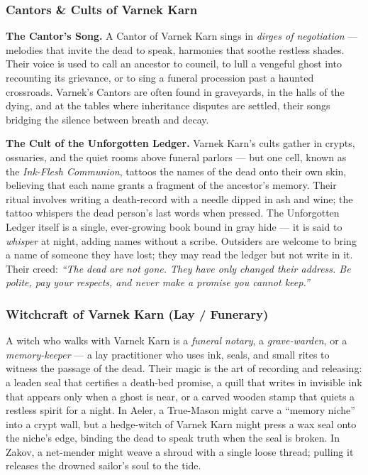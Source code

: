\subsubsection*{Cantors \& Cults of Varnek Karn}

\textbf{The Cantor's Song.} A Cantor of Varnek Karn sings in \textit{dirges of negotiation} --- melodies that invite the dead to speak, harmonies that soothe restless shades. Their voice is used to call an ancestor to council, to lull a vengeful ghost into recounting its grievance, or to sing a funeral procession past a haunted crossroads. Varnek's Cantors are often found in graveyards, in the halls of the dying, and at the tables where inheritance disputes are settled, their songs bridging the silence between breath and decay.

\textbf{The Cult of the Unforgotten Ledger.} Varnek Karn's cults gather in crypts, ossuaries, and the quiet rooms above funeral parlors --- but one cell, known as the \textit{Ink-Flesh Communion}, tattoos the names of the dead onto their own skin, believing that each name grants a fragment of the ancestor's memory. Their ritual involves writing a death-record with a needle dipped in ash and wine; the tattoo whispers the dead person's last words when pressed. The Unforgotten Ledger itself is a single, ever-growing book bound in gray hide --- it is said to \textit{whisper} at night, adding names without a scribe. Outsiders are welcome to bring a name of someone they have lost; they may read the ledger but not write in it. Their creed: \textit{``The dead are not gone. They have only changed their address. Be polite, pay your respects, and never make a promise you cannot keep.''}

\subsubsection*{Witchcraft of Varnek Karn (Lay / Funerary)}

A witch who walks with Varnek Karn is a \textit{funeral notary}, a \textit{grave-warden}, or a \textit{memory-keeper} --- a lay practitioner who uses ink, seals, and small rites to witness the passage of the dead. Their magic is the art of recording and releasing: a leaden seal that certifies a death-bed promise, a quill that writes in invisible ink that appears only when a ghost is near, or a carved wooden stamp that quiets a restless spirit for a night. In Aeler, a True-Mason might carve a ``memory niche'' into a crypt wall, but a hedge-witch of Varnek Karn might press a wax seal onto the niche's edge, binding the dead to speak truth when the seal is broken. In Zakov, a net-mender might weave a shroud with a single loose thread; pulling it releases the drowned sailor's soul to the tide.

